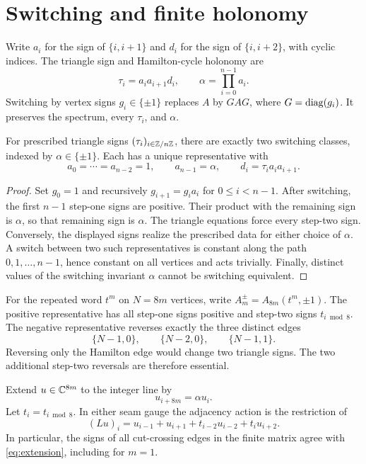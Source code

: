 \section{Switching and finite holonomy}\label{sec:holonomy}

Write $a_i$ for the sign of $\{i,i+1\}$ and $d_i$ for the sign of
$\{i,i+2\}$, with cyclic indices. The triangle sign and Hamilton-cycle
holonomy are
\[
 \tau_i=a_i a_{i+1}d_i,\qquad \alpha=\prod_{i=0}^{n-1}a_i.
\]
Switching by vertex signs $g_i\in\{\pm1\}$ replaces $A$ by $GAG$,
where $G=\operatorname{diag}(g_i)$. It preserves the spectrum, every $\tau_i$, and
$\alpha$.

\begin{lemma}\label{lem:gauge}
For prescribed triangle signs $(\tau_i)_{i\in\mathbb Z/n\mathbb Z}$, there are exactly
two switching classes, indexed by $\alpha\in\{\pm1\}$. Each has a unique
representative with
\[
 a_0=\cdots=a_{n-2}=1,\qquad a_{n-1}=\alpha,
 \qquad d_i=\tau_i a_i a_{i+1}.
\]
\end{lemma}
\begin{proof}
Set $g_0=1$ and recursively $g_{i+1}=g_i a_i$ for $0\le i<n-1$.
After switching, the first $n-1$ step-one signs are positive. Their product
with the remaining sign is $\alpha$, so that remaining sign is $\alpha$.
The triangle equations force every step-two sign. Conversely, the displayed
signs realize the prescribed data for either choice of $\alpha$.
A switch between two such representatives is constant along the path
$0,1,\ldots,n-1$, hence constant on all vertices and acts trivially.
Finally, distinct values of the switching invariant $\alpha$ cannot be
switching equivalent.
\end{proof}

For the repeated word $t^m$ on $N=8m$ vertices, write
$A_m^\pm=A_{8m}(t^m,\pm1)$. The positive representative has all step-one
signs positive and step-two signs $t_{i\bmod8}$. The negative representative
reverses exactly the three distinct edges
\begin{equation}
 \{N-1,0\},\qquad\{N-2,0\},\qquad\{N-1,1\}.
 \label{eq:seam}
\end{equation} Reversing only the Hamilton edge would
change two triangle signs. The two additional step-two reversals are
therefore essential.

Extend $u\in\mathbb C^{8m}$ to the integer line by
\begin{equation}
 u_{i+8m}=\alpha u_i.
 \label{eq:extension}
\end{equation}
Let $t_i=t_{i\bmod8}$. In either seam gauge the adjacency action is the
restriction of
\begin{equation}
 (Lu)_i=u_{i-1}+u_{i+1}+t_{i-2}u_{i-2}+t_i u_{i+2}.
 \label{eq:infinite-action}
\end{equation}
In particular, the signs of all cut-crossing edges in the finite matrix
agree with \eqref{eq:extension}, including for $m=1$.


